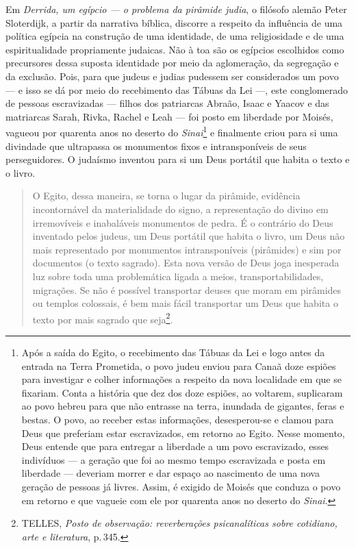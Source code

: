 Em \emph{Derrida, um egípcio --- o problema da pirâmide judia}, o
filósofo alemão Peter Sloterdijk, a partir da narrativa bíblica,
discorre a respeito da influência de uma política egípcia na construção
de uma identidade, de uma religiosidade e de uma espiritualidade
propriamente judaicas. Não à toa são os egípcios escolhidos como
precursores dessa suposta identidade por meio da aglomeração, da
segregação e da exclusão. Pois, para que judeus e judias pudessem ser
considerados um povo --- e isso se dá por meio do recebimento das Tábuas
da Lei ---, este conglomerado de pessoas escravizadas --- filhos dos
patriarcas Abraão, Isaac e Yaacov e das matriarcas Sarah, Rivka, Rachel
e Leah --- foi posto em liberdade por Moisés, vagueou por quarenta anos
no deserto do \emph{Sinai}\footnote{Após a saída do Egito, o recebimento
  das Tábuas da Lei e logo antes da entrada na Terra Prometida, o povo
  judeu enviou para Canaã doze espiões para investigar e colher
  informações a respeito da nova localidade em que se fixariam. Conta a
  história que dez dos doze espiões, ao voltarem, suplicaram ao povo
  hebreu para que não entrasse na terra, inundada de gigantes, feras e
  bestas. O povo, ao receber estas informações, desesperou-se e clamou
  para Deus que preferiam estar escravizados, em retorno ao Egito. Nesse
  momento, Deus entende que para entregar a liberdade a um povo
  escravizado, esses indivíduos --- a geração que foi ao mesmo tempo
  escravizada e posta em liberdade --- deveriam morrer e dar espaço ao
  nascimento de uma nova geração de pessoas já livres. Assim, é exigido
  de Moisés que conduza o povo em retorno e que vagueie com ele por
  quarenta anos no deserto do \emph{Sinai}.} e finalmente criou para si
uma divindade que ultrapassa os monumentos fixos e intransponíveis de
seus perseguidores. O judaísmo inventou para si um Deus portátil que
habita o texto e o livro.

\begin{quote}
O Egito, dessa maneira, se torna o lugar da pirâmide, evidência
incontornável da materialidade do signo, a representação do divino em
irremovíveis e inabaláveis monumentos de pedra. É o contrário do Deus
inventado pelos judeus, um Deus portátil que habita o livro, um Deus não
mais representado por monumentos intransponíveis (pirâmides) e sim por
documentos (o texto sagrado). Esta nova versão de Deus joga inesperada
luz sobre toda uma problemática ligada a meios, transportabilidades,
migrações. Se não é possível transportar deuses que moram em pirâmides
ou templos colossais, é bem mais fácil transportar um Deus que habita o
texto por mais sagrado que seja\footnote{TELLES, \emph{Posto de
  observação: reverberações psicanalíticas sobre cotidiano, arte e
  literatura}, p.\,345.}.
\end{quote}

